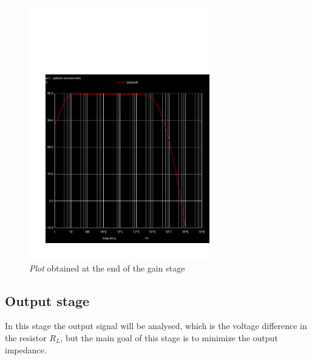 \vspace{-70px}
\begin{figure}[H]
    \centering
    \vspace{-50px}
    \includegraphics[width = 0.7\textwidth]{sim/gainplotdb.pdf}
    \vspace{-30px}
    \caption{\textit{Plot} obtained at the end of the gain stage}
    \label{fig:gaindb}
\end{figure}

\subsection{Output stage}
In this stage the output signal will be analysed, which is the voltage difference in the resistor $R_L$, but the main goal of this stage is to minimize the output impedance.

